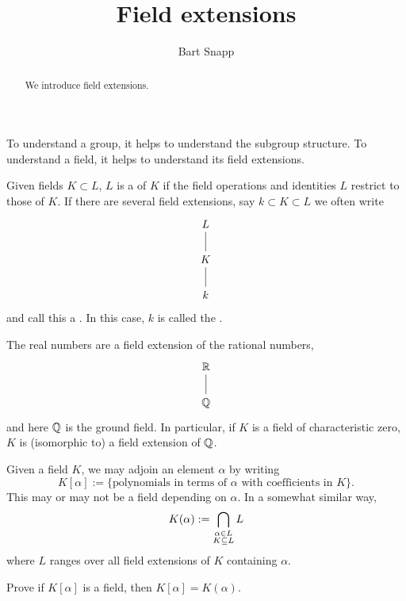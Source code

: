 \documentclass{ximera}
\author{Bart Snapp}
\title{Field extensions}
\begin{document}
\begin{abstract}
  We introduce field extensions.
\end{abstract}
\maketitle

To understand a group, it helps to understand the subgroup
structure. To understand a field, it helps to understand its field
extensions.


\begin{definition}
  Given fields $K\subset L$, $L$ is a  of $K$ if
  the field operations and identities $L$ restrict to those of $K$. If
  there are several field extensions, say $k \subset K \subset L$ we
  often write
  \[
  \begin{tikzcd}
    L\ar[d,-] \\
    K \ar[d,-]\\
    k
  \end{tikzcd}
  \]
  and call this a . In this case, $k$ is called the .
\end{definition}

\begin{example}
  The real numbers are a field extension of the rational numbers,
  \[
  \begin{tikzcd}
    \R\ar[d,-] \\
    \Q
  \end{tikzcd}
  \]
  and here $\mathbb Q$ is the ground field. In particular, if $K$ is a field
  of characteristic zero, $K$ is (isomorphic to) a field extension of $\mathbb Q$.
\end{example}



\begin{example}
  Given a field $K$, we may adjoin an element $\alpha$ by writing
  \[
  K[\alpha] :=\{\text{polynomials in terms of $\alpha$ with
    coefficients in $K$}\}.
  \]
  This may or may not be a field depending on $\alpha$. In a somewhat
  similar way,
  \[
  K(\alpha) := \bigcap_{\substack{\alpha \in L\\ K\subseteq L}} L\index{K(alpha)@$K(\alpha)$}
  \]
  where $L$ ranges over all field extensions of $K$ containing
  $\alpha$.
\end{example}

\begin{exercise}
  Prove if $K[\alpha]$ is a field, then $K[\alpha] = K(\alpha)$.
\end{exercise}
\end{document}
